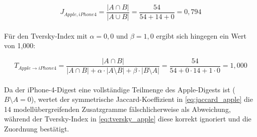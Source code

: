 \begin{equation}
J_{Apple, iPhone4} = \dfrac{|A \cap B|}{|A \cup B|} = \dfrac{54}{54 + 14 + 0} = 0{,}794
\label{eq:jaccard_apple}
\end{equation}\\

Für den Tversky-Index mit \(\alpha = 0{,}0\) und \(\beta = 1{,}0\) ergibt sich hingegen ein Wert von 1{,}000:

\begin{equation}
T_{Apple \to iPhone4} = \dfrac{|A \cap B|}{|A \cap B| + \alpha \cdot |A \setminus B| + \beta \cdot |B \setminus A|} = \dfrac{54}{54 + 0 \cdot 14 + 1 \cdot 0} = 1{,}000
\label{eq:tversky_apple}
\end{equation}\\

Da der iPhone-4-Digest eine vollständige Teilmenge des Apple-Digests ist ($B \setminus A = 0$), wertet der symmetrische Jaccard-Koeffizient in \cref{eq:jaccard_apple} die 14 modellübergreifenden Zusatzgramme fälschlicherweise als Abweichung, während der Tversky-Index in \cref{eq:tversky_apple} diese korrekt ignoriert und die Zuordnung bestätigt.

